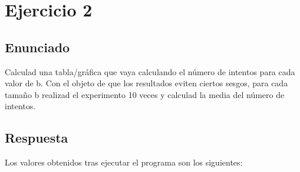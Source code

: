 \documentclass[10pt,a4paper,spanish]{report}
\begin{document}
\chapter{Ejercicio 2}

\section{Enunciado}
\noindent
Calculad una tabla/gráfica que vaya calculando el número de intentos para cada valor de b. Con el objeto de que los resultados eviten ciertos sesgos, para cada tamaño b realizad el experimento 10 veces y calculad la media del número de intentos.

\section{Respuesta}
\noindent
Los valores obtenidos tras ejecutar el programa son los siguientes:
\end{document}
